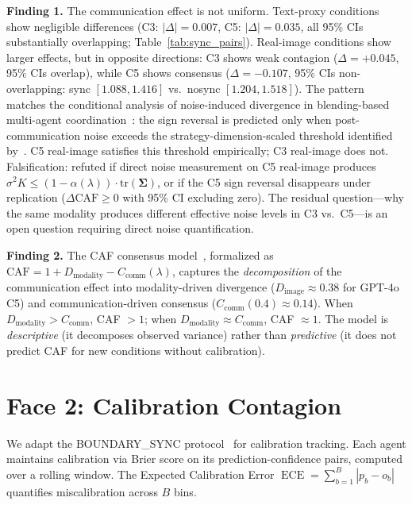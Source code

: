 \documentclass[11pt]{article}
\DeclareMathOperator{\ECE}{ECE}
\begin{document}
\textbf{Finding 1.} The communication effect is not uniform. Text-proxy conditions show negligible differences (C3: $|\Delta| = 0.007$, C5: $|\Delta| = 0.035$, all 95\% CIs substantially overlapping; Table~\ref{tab:sync_pairs}). Real-image conditions show larger effects, but in opposite directions: C3 shows weak contagion ($\Delta = +0.045$, 95\% CIs overlap), while C5 shows consensus ($\Delta = -0.107$, 95\% CIs non-overlapping: sync $[1.088, 1.416]$ vs.\ nosync $[1.204, 1.518]$). The pattern matches the conditional analysis of noise-induced divergence in blending-based multi-agent coordination~\cite{kapetanakis2014balanced,foerster2016learning}: the sign reversal is predicted only when post-communication noise exceeds the strategy-dimension-scaled threshold identified by~\citet{foerster2016learning}. C5 real-image satisfies this threshold empirically; C3 real-image does not. Falsification: refuted if direct noise measurement on C5 real-image produces $\sigma^2 K \leq (1 - \alpha(\lambda)) \cdot \text{tr}(\boldsymbol{\Sigma})$, or if the C5 sign reversal disappears under replication ($\Delta\text{CAF} \geq 0$ with 95\% CI excluding zero). The residual question---why the same modality produces different effective noise levels in C3 vs.\ C5---is an open question requiring direct noise quantification.

\textbf{Finding 2.} The CAF consensus model~\cite{liu2026mmepc}, formalized as $\text{CAF} = 1 + D_{\text{modality}} - C_{\text{comm}}(\lambda)$, captures the \textit{decomposition} of the communication effect into modality-driven divergence ($D_{\text{image}} \approx 0.38$ for GPT-4o C5) and communication-driven consensus ($C_{\text{comm}}(0.4) \approx 0.14$). When $D_{\text{modality}} > C_{\text{comm}}$, CAF $> 1$; when $D_{\text{modality}} \approx C_{\text{comm}}$, CAF $\approx 1$. The model is \textit{descriptive} (it decomposes observed variance) rather than \textit{predictive} (it does not predict CAF for new conditions without calibration).

\section{Face 2: Calibration Contagion}

We adapt the BOUNDARY\_SYNC protocol~\citep{liu2026boundarysync} for calibration tracking. Each agent maintains calibration via Brier score on its prediction-confidence pairs, computed over a rolling window. The Expected Calibration Error $\ECE = \sum_{b=1}^{B} |p_b - o_b|$ quantifies miscalibration across $B$ bins.
\end{document}
